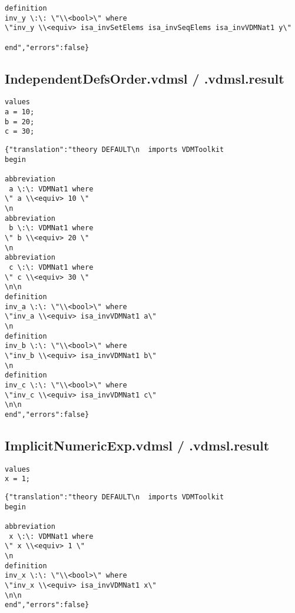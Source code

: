 \begin{appendices}
\begin{lstlisting}
definition
inv_y \:\: \"\\<bool>\" where
\"inv_y \\<equiv> isa_invSetElems isa_invSeqElems isa_invVDMNat1 y\"

end","errors":false}
\end{lstlisting}

\subsection{IndependentDefsOrder.vdmsl / .vdmsl.result}
\begin{lstlisting}
values
a = 10;
b = 20;
c = 30;
\end{lstlisting}

\begin{lstlisting}
{"translation":"theory DEFAULT\n  imports VDMToolkit
begin

abbreviation
 a \:\: VDMNat1 where 
\" a \\<equiv> 10 \" 
\n
abbreviation
 b \:\: VDMNat1 where 
\" b \\<equiv> 20 \" 
\n
abbreviation
 c \:\: VDMNat1 where 
\" c \\<equiv> 30 \" 
\n\n
definition
inv_a \:\: \"\\<bool>\" where
\"inv_a \\<equiv> isa_invVDMNat1 a\"
\n
definition
inv_b \:\: \"\\<bool>\" where
\"inv_b \\<equiv> isa_invVDMNat1 b\"
\n
definition
inv_c \:\: \"\\<bool>\" where
\"inv_c \\<equiv> isa_invVDMNat1 c\"
\n\n
end","errors":false}
\end{lstlisting}

\subsection{ImplicitNumericExp.vdmsl / .vdmsl.result}
\begin{lstlisting}
values
x = 1;
\end{lstlisting}

\begin{lstlisting}
{"translation":"theory DEFAULT\n  imports VDMToolkit
begin

abbreviation
 x \:\: VDMNat1 where 
\" x \\<equiv> 1 \" 
\n
definition
inv_x \:\: \"\\<bool>\" where
\"inv_x \\<equiv> isa_invVDMNat1 x\"
\n\n
end","errors":false}
\end{lstlisting}


\end{appendices}
